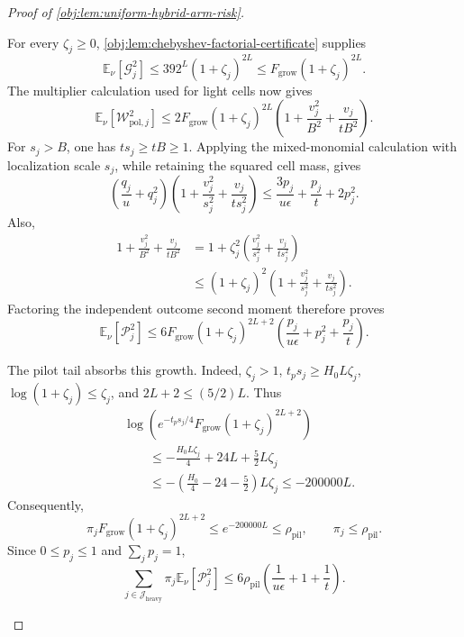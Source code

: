 \documentclass[11pt]{article}
\begin{document}
\begin{proof}[Proof of \cref{obj:lem:uniform-hybrid-arm-risk}]
\begin{enumerate}
For every \(\zeta_j\ge0\),
\cref{obj:lem:chebyshev-factorial-certificate} supplies
\[
\mathbb E_\nu[\mathcal G_j^2]
\le392^L(1+\zeta_j)^{2L}
\le F_{\mathrm{grow}}(1+\zeta_j)^{2L}.
\]
The multiplier calculation used for light cells now gives
\[
\mathbb E_\nu[\mathcal W_{\mathrm{pol},j}^2]
\le
2F_{\mathrm{grow}}(1+\zeta_j)^{2L}
\left(1+\frac{v_j^2}{B^2}+\frac{v_j}{tB^2}\right).
\]
For \(s_j>B\), one has \(ts_j\ge tB\ge1\). Applying the mixed-monomial calculation with localization scale \(s_j\), while retaining the squared cell mass, gives
\[
\left(\frac{q_j}{u}+q_j^2\right)
\left(1+\frac{v_j^2}{s_j^2}+\frac{v_j}{ts_j^2}\right)
\le
\frac{3p_j}{u\epsilon}+\frac{p_j}{t}+2p_j^2.
\]
Also,
\[
\begin{aligned}
1+\frac{v_j^2}{B^2}+\frac{v_j}{tB^2}
&=
1+\zeta_j^2
\left(\frac{v_j^2}{s_j^2}+\frac{v_j}{ts_j^2}\right)\\
&\le
(1+\zeta_j)^2
\left(1+\frac{v_j^2}{s_j^2}+\frac{v_j}{ts_j^2}\right).
\end{aligned}
\]
Factoring the independent outcome second moment therefore proves
\[
\mathbb E_\nu[\mathcal P_j^2]
\le
6F_{\mathrm{grow}}(1+\zeta_j)^{2L+2}
\left(\frac{p_j}{u\epsilon}+p_j^2+\frac{p_j}{t}\right).
\]

The pilot tail absorbs this growth. Indeed, \(\zeta_j>1\),
\(t_ps_j\ge H_0L\zeta_j\), \(\log(1+\zeta_j)\le\zeta_j\), and
\(2L+2\le(5/2)L\). Thus
\[
\begin{aligned}
&\log\left(
e^{-t_ps_j/4}F_{\mathrm{grow}}(1+\zeta_j)^{2L+2}
\right)\\
&\qquad\le
-\frac{H_0L\zeta_j}{4}
+24L+\frac52L\zeta_j\\
&\qquad\le
-\left(\frac{H_0}{4}-24-\frac52\right)L\zeta_j
\le-200000L.
\end{aligned}
\]
Consequently,
\[
\pi_jF_{\mathrm{grow}}(1+\zeta_j)^{2L+2}
\le e^{-200000L}\le\rho_{\mathrm{pil}},
\qquad
\pi_j\le\rho_{\mathrm{pil}}.
\]
Since \(0\le p_j\le1\) and \(\sum_jp_j=1\),
\[
\sum_{j\in\mathcal J_{\mathrm{heavy}}}
\pi_j\mathbb E_\nu[\mathcal P_j^2]
\le
6\rho_{\mathrm{pil}}
\left(\frac1{u\epsilon}+1+\frac1t\right).
\]


\end{enumerate}
\end{proof}
\end{document}
